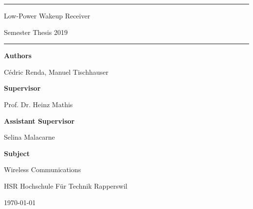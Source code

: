 \documentclass[a4paper,12pt]{book}
\begin{document}
\pagestyle{fancy}
\lhead{}
\rhead{}
\frontmatter
\newcommand\HRule{\noindent\rule{\linewidth}{1.5pt}}



\hypersetup{
	colorlinks=true,
	linktoc=all,
	linkcolor=blue
}


\newtheorem{satz}{Theorem}[chapter]
\newtheorem{problem}[satz]{Problem}
\newtheorem{hilfssatz}[satz]{Lemma}
\newtheorem{definition}[satz]{Definition}
\newtheorem{annahme}[satz]{Assumption}
\newtheorem{aufgabe}[satz]{Task}
\newenvironment{beispiel}[1][Example]{%
	\begin{proof}[#1]%
		\renewcommand{\qedsymbol}{$\bigcirc$}
	}{\end{proof}}


\begin{titlepage}
\HRule
\vspace*{10pt}
\begin{flushright}
{\Huge
Low-Power Wakeup Receiver}

\end{flushright}
\begin{flushright}
{\Large Semester Thesis 2019}
\end{flushright}
\HRule

\vspace{70pt}
\large
\textbf{Authors}

Cédric Renda, Manuel Tischhauser

\textbf{Supervisor}

Prof. Dr. Heinz Mathis

\textbf{Assistant Supervisor}

Selina Malacarne

\textbf{Subject}

Wireless Communications



\begin{center}
HSR Hochschule Für Technik Rapperswil

\today
\end{center}
\end{titlepage}



\tableofcontents

\mainmatter








\end{document}
